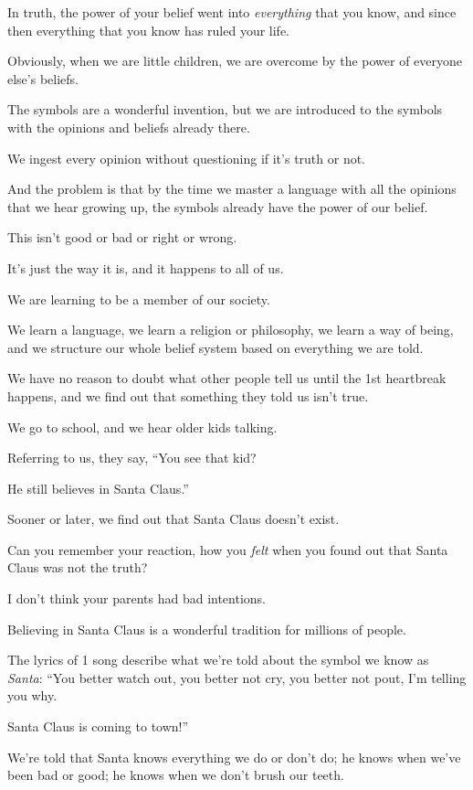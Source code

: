 \documentclass{article}
\numberwithin{equation}{section}
\begin{document}
In truth, the power of your belief went into \textit{everything} that you know, and since then everything that you know has ruled your life.

Obviously, when we are little children, we are overcome by the power of everyone else's beliefs.

The symbols are a wonderful invention, but we are introduced to the symbols with the opinions and beliefs already there.

We ingest every opinion without questioning if it's truth or not.

And the problem is that by the time we master a language with all the opinions that we hear growing up, the symbols already have the power of our belief.

This isn't good or bad or right or wrong.

It's just the way it is, and it happens to all of us.

We are learning to be a member of our society.

We learn a language, we learn a religion or philosophy, we learn a way of being, and we structure our whole belief system based on everything we are told.

We have no reason to doubt what other people tell us until the 1st heartbreak happens, and we find out that something they told us isn't true.

%
We go to school, and we hear older kids talking.

Referring to us, they say, ``You see that kid?

He still believes in Santa Claus.''

Sooner or later, we find out that Santa Claus doesn't exist.

Can you remember your reaction, how you \textit{felt} when you found out that Santa Claus was not the truth?

I don't think your parents had bad intentions.

Believing in Santa Claus is a wonderful tradition for millions of people.

The lyrics of 1 song describe what we're told about the symbol we know as \textit{Santa}: ``You better watch out, you better not cry, you better not pout, I'm telling you why.

Santa Claus is coming to town!''

We're told that Santa knows everything we do or don't do; he knows when we've been bad or good; he knows when we don't brush our teeth.
\end{document}
